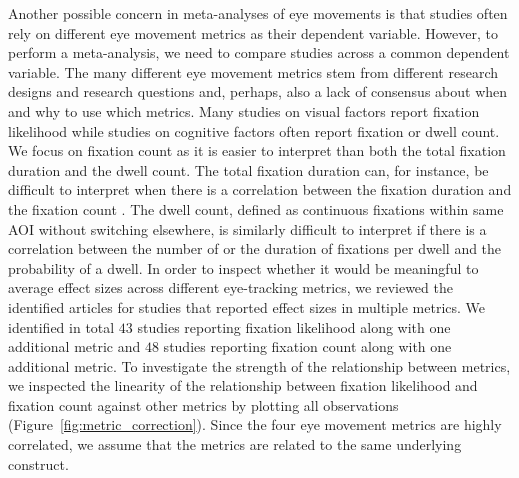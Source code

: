 \documentclass[english,natbib,man,floatsintext]{apa6}
\begin{document}
Another possible concern in meta-analyses of eye movements is that studies often rely on different eye movement metrics as their dependent variable. However, to perform a meta-analysis, we need to compare studies across a common dependent variable. The many different eye movement metrics stem from different research designs and research questions and, perhaps, also a lack of consensus about when and why to use which metrics. Many studies on visual factors report fixation likelihood while studies on cognitive factors often report fixation or dwell count. We focus on fixation count as it is easier to interpret than both the total fixation duration and the dwell count. The total fixation duration can, for instance, be difficult to interpret when there is a correlation between the fixation duration and the fixation count \citep{orquin2018a}. The dwell count, defined as continuous fixations within same AOI without switching elsewhere, is similarly difficult to interpret if there is a correlation between the number of or the duration of fixations per dwell and the probability of a dwell. In order to inspect whether it would be meaningful to average effect sizes across different eye-tracking metrics, we reviewed the identified articles for studies that reported effect sizes in multiple metrics. We identified in total $43$ studies reporting fixation likelihood along with one additional metric and $48$ studies reporting fixation count along with one additional metric. To investigate the strength of the relationship between metrics, we inspected the linearity of the relationship between fixation likelihood and fixation count against other metrics by plotting all observations (Figure~\ref{fig:metric_correction}). Since the four eye movement metrics are highly correlated, we assume that the metrics are related to the same underlying construct. 
\end{document}
